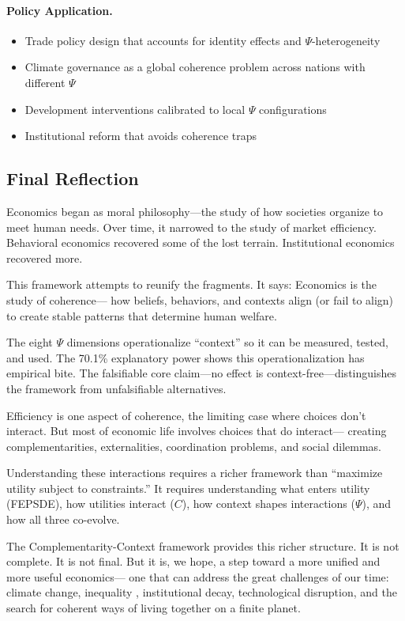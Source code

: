 \paragraph{Policy Application.}
\begin{itemize}
  \item Trade policy design that accounts for identity effects and $\Psi$-heterogeneity
  \item Climate governance as a global coherence problem across nations with different $\Psi$
  \item Development interventions calibrated to local $\Psi$ configurations
  \item Institutional reform that avoids coherence traps
\end{itemize}

\subsection{Final Reflection}

Economics began as moral philosophy---the study of how societies organize
to meet human needs. Over time, it narrowed to the study of market efficiency.
Behavioral economics recovered some of the lost terrain.
Institutional economics recovered more.

This framework attempts to reunify the fragments.
It says: Economics is the study of coherence---
how beliefs, behaviors, and contexts align (or fail to align)
to create stable patterns that determine human welfare.

The eight $\Psi$ dimensions operationalize ``context'' so it can be measured, tested, and used.
The 70.1\% explanatory power shows this operationalization has empirical bite.
The falsifiable core claim---no effect is context-free---distinguishes the framework from unfalsifiable alternatives.

Efficiency is one aspect of coherence, the limiting case where choices don't interact.
But most of economic life involves choices that do interact---
creating complementarities, externalities, coordination problems, and social dilemmas.

Understanding these interactions requires a richer framework than
``maximize utility subject to constraints.''
It requires understanding what enters utility (FEPSDE),
how utilities interact ($C$), how context shapes interactions ($\Psi$),
and how all three co-evolve.

The Complementarity-Context framework provides this richer structure.
It is not complete. It is not final. But it is, we hope, a step toward
a more unified and more useful economics---
one that can address the great challenges of our time:
climate change, inequality \citep{piketty2014}, institutional decay, technological disruption,
and the search for coherent ways of living together on a finite planet.

